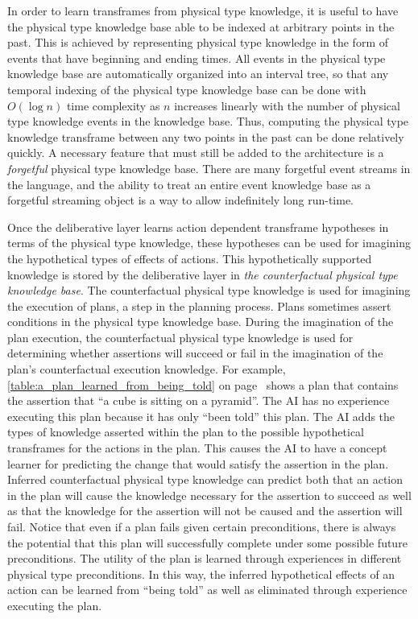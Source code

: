 In order to learn transframes from physical type knowledge, it is
useful to have the physical type knowledge base able to be indexed at
arbitrary points in the past.  This is achieved by representing
physical type knowledge in the form of events that have beginning and
ending times.  All events in the physical type knowledge base are
automatically organized into an interval tree, so that any temporal
indexing of the physical type knowledge base can be done with $O(\log
n)$ time complexity as $n$ increases linearly with the number of
physical type knowledge events in the knowledge base.  Thus, computing
the physical type knowledge transframe between any two points in the
past can be done relatively quickly.  A necessary feature that must
still be added to the architecture is a \emph{forgetful} physical type
knowledge base.  There are many forgetful event streams in the
language, and the ability to treat an entire event knowledge base as a
forgetful streaming object is a way to allow indefinitely long
run-time.

Once the deliberative layer learns action dependent transframe
hypotheses in terms of the physical type knowledge, these hypotheses
can be used for imagining the hypothetical types of effects of
actions.  This hypothetically supported knowledge is stored by the
deliberative layer in \emph{the counterfactual physical type knowledge
  base}.  The counterfactual physical type knowledge is used for
imagining the execution of plans, a step in the planning process.
Plans sometimes assert conditions in the physical type knowledge base.
During the imagination of the plan execution, the counterfactual
physical type knowledge is used for determining whether assertions
will succeed or fail in the imagination of the plan's counterfactual
execution knowledge.  For example,
{\mbox{\autoref{table:a_plan_learned_from_being_told}}} on
{\mbox{page~\pageref{table:a_plan_learned_from_being_told}}} shows a
plan that contains the assertion that ``a cube is sitting on a
pyramid''.  The AI has no experience executing this plan because it
has only ``been told'' this plan.  The AI adds the types of knowledge
asserted within the plan to the possible hypothetical transframes for
the actions in the plan.  This causes the AI to have a concept learner
for predicting the change that would satisfy the assertion in the
plan.  Inferred counterfactual physical type knowledge can predict
both that an action in the plan will cause the knowledge necessary for
the assertion to succeed as well as that the knowledge for the
assertion will not be caused and the assertion will fail.  Notice that
even if a plan fails given certain preconditions, there is always the
potential that this plan will successfully complete under some
possible future preconditions.  The utility of the plan is learned
through experiences in different physical type preconditions.  In this
way, the inferred hypothetical effects of an action can be learned
from ``being told'' as well as eliminated through experience executing
the plan.

